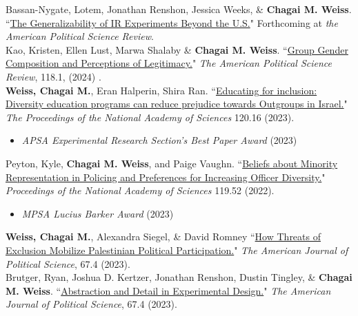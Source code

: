 \documentclass[11pt]{article}
\begin{document}
Bassan-Nygate, Lotem, Jonathan Renshon, Jessica Weeks, \& \textbf{Chagai M. Weiss}. ``\href{https://www.cambridge.org/core/journals/american-political-science-review/article/generalizability-of-ir-experiments-beyond-the-united-states/263CE4FF8EA7AAEC76A176BF3E05626C}{The Generalizability of IR Experiments Beyond the U.S.}"  Forthcoming at \emph{the American Political Science Review}.\\
 

Kao, Kristen, Ellen Lust, Marwa Shalaby \& \textbf{Chagai M. Weiss}. ``\href{https://www.cambridge.org/core/services/aop-cambridge-core/content/view/15DE6206F7E5D3D9707D590B81A40C58/S0003055423000357a.pdf/female_representation_and_legitimacy_evidence_from_a_harmonized_experiment_in_jordan_morocco_and_tunisia.pdf}{Group Gender Composition and Perceptions of Legitimacy.}" \emph{The American Political Science Review}, 118.1, (2024) .  \\    

\textbf{Weiss, Chagai M.}, Eran Halperin, Shira Ran. ``\href{https://www.pnas.org/doi/10.1073/pnas.2218621120}{Educating for inclusion: Diversity education programs can reduce prejudice towards Outgroups in Israel.}"  \emph{The Proceedings of the National Academy of Sciences} 120.16 (2023). 
 \begin{itemize}[label=$\star$]
 \item \emph{APSA Experimental Research Section's Best Paper Award} (2023)
\end{itemize} 


Peyton, Kyle, \textbf{Chagai M. Weiss}, and Paige Vaughn. ``\href{https://www.pnas.org/doi/10.1073/pnas.2213986119}{Beliefs about Minority Representation in Policing and Preferences for Increasing Officer Diversity.}" \emph{Proceedings of the National Academy of Sciences} 119.52 (2022).
 \begin{itemize}[label=$\star$]
 \item \emph{MPSA Lucius Barker Award} (2023)
\end{itemize}

\textbf{Weiss, Chagai M.}, Alexandra Siegel, \& David Romney ``\href{https://onlinelibrary.wiley.com/doi/full/10.1111/ajps.12718}{How Threats of Exclusion Mobilize Palestinian Political Participation.}" \emph{The American Journal of Political Science}, 67.4 (2023).\\

Brutger, Ryan, Joshua D. Kertzer, Jonathan Renshon, Dustin Tingley, \& \textbf{Chagai M. Weiss}. ``\href{https://onlinelibrary.wiley.com/doi/full/10.1111/ajps.12710}{Abstraction and Detail in Experimental Design.}" \emph{The American Journal of Political Science}, 67.4 (2023).\\
\end{document}
